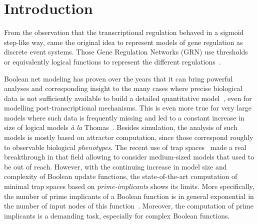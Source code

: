 \documentclass[preprint,12pt]{elsarticle}
\begin{document}
\linenumbers

\section{Introduction}

From the observation that the transcriptional regulation behaved in a sigmoid step-like way, came the original idea to represent models of gene regulation as discrete event systems.
Those Gene Regulation Networks (GRN) use thresholds or equivalently logical functions to represent the different regulations~\cite{glass1973logical,thomas1973boolean,thomas1990biological,thomas1991regulatory}.

Boolean net modeling has proven over the years that it can bring powerful analyses and corresponding insight to the many cases where precise biological data is not sufficiently available to build a detailed quantitative model~\cite{wang2012boolean}, even for modelling post-transcriptional mechanisms.
This is even more true for very large models where such data is frequently missing and led to a constant increase in size of logical models \emph{à la} Thomas~\cite{aghamiri2020automated}.
Besides simulation, the analysis of such models is mostly based on attractor computation, since those correspond roughly to observable biological \emph{phenotypes}.
The recent use of trap spaces~\cite{klarner2015computing} made a real breakthrough in that field allowing to consider medium-sized models that used to be out of reach.
However, with the continuing increase in model size and complexity of Boolean update functions, the state-of-the-art computation of minimal trap spaces based on \emph{prime-implicants} shows its limits.
More specifically, the number of prime implicants of a Boolean function is in general exponential in the number of input nodes of this function~\cite{klarner2015computing}.
Moreover, the computation of prime implicants is a demanding task, especially for complex Boolean functions.
\end{document}
